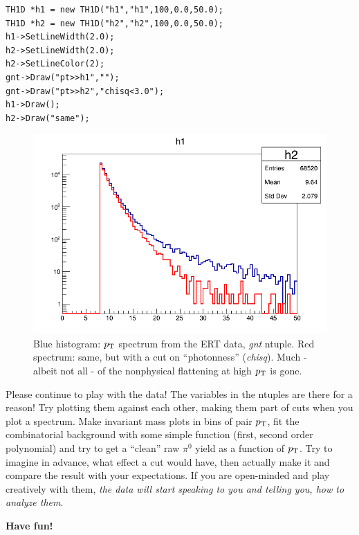 \documentclass[12pt,letterpaper,aps,prc,superscriptaddress,showpacs,
longbibliography,nofootinbib,floatfix,onecolumn]{revtex4-1}
\newcommand{\pt}{\mbox{$p_{\rm T}$}\xspace}
\newcommand{\piz}{\mbox{$\pi^0$}\xspace}
\begin{document}
\begin{verbatim}
TH1D *h1 = new TH1D("h1","h1",100,0.0,50.0);
TH1D *h2 = new TH1D("h2","h2",100,0.0,50.0);
h1->SetLineWidth(2.0);
h2->SetLineWidth(2.0);
h2->SetLineColor(2);
gnt->Draw("pt>>h1","");
gnt->Draw("pt>>h2","chisq<3.0");
h1->Draw();
h2->Draw("same");
\end{verbatim}


\begin{center}
\begin{figure}[htbp]
  \includegraphics[width=0.5\linewidth]{figs/ertgntpt}
  \caption{Blue histogram: \pt spectrum from the ERT data, 
    {\it gnt} ntuple.  Red spectrum: same, but with a cut on
    ``photonness'' ({\it chisq}).  Much - albeit not all - of the
    nonphysical flattening at high \pt is gone.
  }
  \label{fig:ertgntpt}
\end{figure}
\end{center}





\noindent
Please continue to play with the data!  The variables in the ntuples
are there for a reason!  Try plotting them against each other, making
them part of cuts when you plot a spectrum.  Make invariant mass plots
in bins of pair \pt, fit the combinatorial background with some simple
function (first, second order polynomial) and try to get a ``clean''
raw \piz yield as a function of \pt.  Try to imagine in advance, what
effect a cut would have, then actually make it and compare the result
with your expectations.  If you are open-minded and play creatively
with them, {\it the data will start speaking to you and telling you,
  how to analyze them}.

\vspace{0.2in}

\noindent
{\bf Have fun!}
\end{document}
